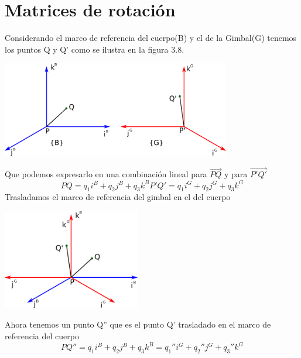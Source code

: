 \section{Matrices de rotación}
Considerando el marco de referencia del cuerpo(B) y el de la Gimbal(G) tenemos los puntos Q y Q'
como se ilustra en la figura 3.8.
\begin{center}
	\includegraphics[width=0.75\textwidth]{Contenido/Cuerpo/Capitulo3/Fig13.eps}
	\label{fig:ModeloMat:Fig1}
\end{center}
Que podemos expresarlo en una combinación lineal para $\overrightarrow{PQ}$ y para $\overrightarrow{P'Q'}$
\begin{subequations}
	\begin{equation}
		PQ = q_1i^B + q_2j^B + q_3k^B
	\end{equation}
	\begin{equation}
		P'Q' = q_1i^G + q_2j^G + q_3k^G
	\end{equation}
\end{subequations}
Trasladamos el marco de referencia del gimbal en el del cuerpo
\begin{center}
	\includegraphics[width=0.45\textwidth]{Contenido/Cuerpo/Capitulo3/Fig14.eps}
	\label{fig:ModeloMat:Fig1}
\end{center}
Ahora tenemos un punto Q'' que es el punto Q' trasladado en el marco de referencia del cuerpo
\begin{equation}
	PQ'' = q_1i^B + q_2j^B + q_3k^B = q_1''i^G + q_2''j^G + q_3''k^G
\end{equation}
